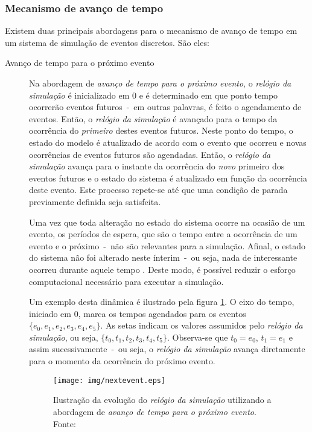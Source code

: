 \subsubsection{\label{chap:sim:timeadvance}Mecanismo de avanço de tempo}

Existem duas principais abordagens para o mecanismo de avanço de tempo em um sistema de simulação de eventos discretos. São eles:

\begin{description}
\item[Avanço de tempo para o próximo evento] \hfill

Na abordagem de \textit{avanço de tempo para o próximo evento}, o
\textit{relógio da simulação} é inicializado em 0 e é determinado em que ponto
tempo ocorrerão eventos futuros~-~em outras palavras, é feito o agendamento de
eventos. Então, o \textit{relógio da simulação} é avançado para o tempo da
ocorrência do \textit{primeiro} destes eventos futuros. Neste ponto do tempo, o
estado do modelo é atualizado de acordo com o evento que ocorreu e novas
ocorrências de eventos futuros são agendadas. Então, o \textit{relógio da
simulação} avança para o instante da ocorrência do \textit{novo} primeiro dos
eventos futuros e o estado do sistema é atualizado em função da ocorrência deste
evento. Este processo repete-se até que uma condição de parada previamente
definida seja satisfeita.

Uma vez que toda alteração no estado do sistema ocorre na ocasião de um evento,
os períodos de espera, que são o tempo entre a ocorrência de um evento e o
próximo~-~não são relevantes para a simulação. Afinal, o estado do sistema não
foi alterado neste ínterim~-~ou seja, nada de interessante ocorreu durante
aquele tempo \cite{Sim}. Deste modo, é possível reduzir o esforço computacional
necessário para executar a simulação.

Um exemplo desta dinâmica é ilustrado pela figura \ref{fig:nextevent}. O eixo do
tempo, iniciado em 0, marca os tempos agendados para os eventos $\{e_{0}, e_{1},
e_{2}, e_{3}, e_{4}, e_{5}\}$. As setas indicam os valores assumidos pelo
\textit{relógio da simulação}, ou seja, $\{t_{0}, t_{1}, t_{2}, t_{3}, t_{4},
t_{5}\}$. Observa-se que $t_{0} = e_{0}$, $t_{1} = e_{1}$ e assim
sucessivamente~-~ou seja, o \textit{relógio da simulação} avança diretamente
para o momento da ocorrência do próximo evento.

\begin{figure}[htb!]
\centering\texttt{[image: img/nextevent.eps]}
\caption[Avanço de tempo para o próximo evento]{\label{fig:nextevent}Ilustração da evolução do \textit{relógio da simulação} utilizando a abordagem de \textit{avanço de tempo para o próximo evento}. Fonte:~\cite{Law}}
\end{figure}


\end{description}
